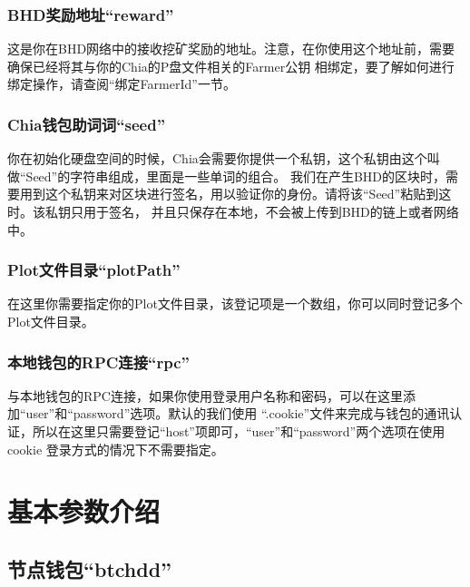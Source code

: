 \subsubsection{BHD奖励地址``reward''}
\begin{flushleft}
    这是你在BHD网络中的接收挖矿奖励的地址。注意，在你使用这个地址前，需要确保已经将其与你的Chia的P盘文件相关的Farmer公钥
    相绑定，要了解如何进行绑定操作，请查阅``绑定FarmerId''一节。
\end{flushleft}
\subsubsection{Chia钱包助词词``seed''}
\begin{flushleft}
    你在初始化硬盘空间的时候，Chia会需要你提供一个私钥，这个私钥由这个叫做``Seed''的字符串组成，里面是一些单词的组合。
    我们在产生BHD的区块时，需要用到这个私钥来对区块进行签名，用以验证你的身份。请将该``Seed''粘贴到这时。该私钥只用于签名，
    并且只保存在本地，不会被上传到BHD的链上或者网络中。
\end{flushleft}
\subsubsection{Plot文件目录``plotPath''}
\begin{flushleft}
    在这里你需要指定你的Plot文件目录，该登记项是一个数组，你可以同时登记多个Plot文件目录。
\end{flushleft}
\subsubsection{本地钱包的RPC连接``rpc''}
\begin{flushleft}
    与本地钱包的RPC连接，如果你使用登录用户名称和密码，可以在这里添加``user''和``password''选项。默认的我们使用
    ``.cookie''文件来完成与钱包的通讯认证，所以在这里只需要登记``host''项即可，``user''和``password''两个选项在使用cookie
    登录方式的情况下不需要指定。
\end{flushleft}
\section{基本参数介绍}
\subsection{节点钱包``btchdd''}
